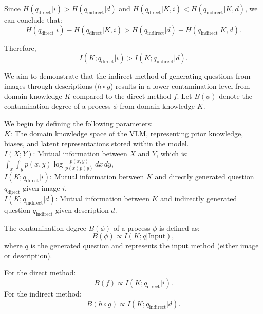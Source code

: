 \begin{lemma}
Since \( H(q_{\text{direct}} | i) > H(q_{\text{indirect}} | d) \) and \( H(q_{\text{direct}} | K, i) < H(q_{\text{indirect}} | K, d) \), we can conclude that:
\begin{equation}
H(q_{\text{direct}} | i) - H(q_{\text{direct}} | K, i) > H(q_{\text{indirect}} | d) - H(q_{\text{indirect}} | K, d).
\end{equation}

Therefore,
\begin{equation}
I(K; q_{\text{direct}} | i) > I(K; q_{\text{indirect}} | d).
\end{equation}

\end{lemma}

\begin{proof1}

We aim to demonstrate that the indirect method of generating questions from images through descriptions (\( h \circ g \)) results in a lower contamination level from domain knowledge \( K \) compared to the direct method \( f \). Let \( B(\phi) \) denote the contamination degree of a process \( \phi \) from domain knowledge \( K \).

We begin by defining the following parameters:\\
 \( K \): The domain knowledge space of the VLM, representing prior knowledge, biases, and latent representations stored within the model.\\
 \( I(X; Y) \): Mutual information between \( X \) and \( Y \), which is:
    $\int_{x} \int_{y} p(x, y) \log \frac{p(x, y)}{p(x)p(y)} \, dx \, dy,$\\
 \( I(K; q_{\text{direct}} | i) \): Mutual information between \( K \) and directly generated question \( q_{\text{direct}} \) given image \( i \).\\
 \( I(K; q_{\text{indirect}} | d) \): Mutual information between \( K \) and indirectly generated question \( q_{\text{indirect}} \) given description \( d \).


The contamination degree \( B(\phi) \) of a process \( \phi \) is defined as:
\begin{equation}
B(\phi) \propto I(K; q | \text{Input}),
\end{equation}
where \( q \) is the generated question and  represents the input method (either image or description).

For the direct method:
\begin{equation}
B(f) \propto I(K; q_{\text{direct}} | i).
\end{equation}
For the indirect method:
\begin{equation}
B(h \circ g) \propto I(K; q_{\text{indirect}} | d).
\end{equation}


\end{proof1}
